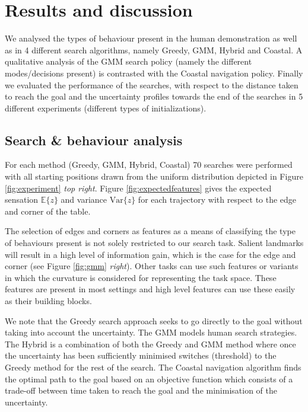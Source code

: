 \section{Results and discussion}

We analysed the types of behaviour present in the human demonstration as well as in
4 different search algorithms, namely Greedy, GMM, Hybrid and Coastal. A qualitative analysis of the GMM search policy 
(namely the different modes/decisions present) is contrasted with the Coastal navigation policy. Finally we evaluated the 
performance of the searches, with respect to the distance taken to reach the goal and the uncertainty profiles towards the end of 
the searches in 5 different experiments (different types of initializations). 

\subsection{Search \& behaviour analysis}

For each method (Greedy, GMM, Hybrid, Coastal) 70 searches were performed with all starting positions drawn from the
uniform distribution depicted in Figure \ref{fig:experiment} \textit{top right}. Figure \ref{fig:expectedfeatures} 
gives the expected sensation $\mathbb{E}\{z\}$ and  variance $\mathrm{Var}\{z\}$ for each trajectory with respect 
to the edge and corner of the table. 


The selection of edges and corners as features as a means of classifying the type of behaviours present 
is not solely restricted to our search task. Salient landmarks will result in a high level of information
gain, which is the case for the edge and corner (see Figure \ref{fig:gmm} \textit{right}).
Other tasks can use such features or variants in which the curvature is considered for representing the task space. 
These features are present in most settings and high level features can use these easily as their building blocks.


We note that the Greedy search approach seeks to go directly to the goal without taking into account 
the uncertainty. The GMM models human search strategies. The Hybrid is a combination of both the Greedy and GMM method 
where once the uncertainty has been sufficiently minimised switches (threshold) to the Greedy method for the rest of 
the search. The Coastal navigation algorithm finds the optimal path to the goal based on an objective function which
consists of a trade-off between time taken to reach the goal and the minimisation of the uncertainty.

